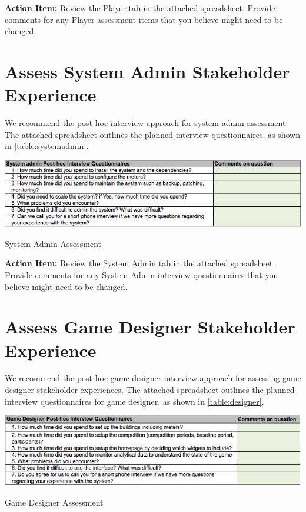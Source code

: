 \documentclass[11pt,oneside]{book}
\begin{document}
\begin{shadebox}
{\bf Action Item:} Review the Player tab in the attached
spreadsheet.  Provide comments for any Player assessment items that
you believe might need to be changed. 
\end{shadebox}

\section{Assess System Admin Stakeholder Experience}

We recommend the post-hoc interview approach for system admin assessment. The attached spreadsheet outlines the planned interview questionnaires, as shown in \autoref{table:systemadmin}.

\begin{table}[ht!]
  \center
  \includegraphics[width=0.9\columnwidth]{systemadmin}
  \caption{System Admin Assessment}
  \label{table:systemadmin}
\end{table}

\begin{shadebox}
{\bf Action Item:} Review the System Admin tab in the attached
spreadsheet.  Provide comments for any System Admin interview questionnaires that
you believe might need to be changed. 
\end{shadebox}

\section{Assess Game Designer Stakeholder Experience}

We recommend the post-hoc game designer interview approach for assessing game designer stakeholder experiences. The attached spreadsheet outlines the planned interview questionnaires for game designer, as shown in \autoref{table:designer}.

\begin{table}[ht!]
  \center
  \includegraphics[width=0.9\columnwidth]{designer}
  \caption{Game Designer Assessment}
  \label{table:designer}
\end{table}
\end{document}
